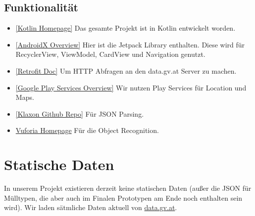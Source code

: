 \documentclass{mrtrash}
\begin{document}
\subsection{Funktionalität}

\begin{itemize}
    \item \href{https://kotlinlang.org/}{[Kotlin Homepage]} Das gesamte Projekt ist in Kotlin entwickelt worden.
    \item \href{https://developer.android.com/jetpack/androidx}{[AndroidX Overview]} Hier ist die Jetpack Library enthalten. Diese wird für RecyclerView, ViewModel, CardView und Navigation genutzt.
    \item \href{https://square.github.io/retrofit/}{[Retrofit Doc]} Um HTTP Abfragen an den data.gv.at Server zu machen.
    \item \href{https://developers.google.com/android/guides/overview}{[Google Play Services Overview]} Wir nutzen Play Services für Location und Maps.
    \item \href{https://github.com/cbeust/klaxon}{[Klaxon Github Repo]} Für JSON Parsing.
    \item \href{https://developer.vuforia.com/}{Vuforia Homepage} Für die Object Recognition.
\end{itemize}

\section{Statische Daten}

In unserem Projekt existieren derzeit keine statischen Daten (außer die JSON für Mülltypen, die aber auch im Finalen Prototypen am Ende noch enthalten sein wird). Wir laden sätmliche Daten aktuell von \href{https://data.gv.at}{data.gv.at}.

%
%
\end{document}
